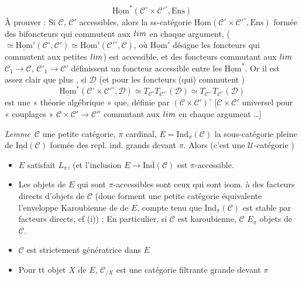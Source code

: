 \documentclass[11pt,a4paper]{article}
\begin{document}
\[
  \underline{\mathrm{Hom}}^{*}(\mathcal{C}^{\circ} \times \mathcal{C}'^{\circ},
  \mathrm{Ens})
\]
À prouver : Si $\mathcal{C}$, $\mathcal{C}'$ accessibles, alors la
ss-catégorie  $\underline{\mathrm{Hom}}(\mathcal{C}^{\circ} \times
\mathcal{C}'^{\circ}, \mathrm{Ens})$ formée des bifoncteurs qui commutent aux
$\varprojlim$  en chaque argument, ($\simeq
\underline{\mathrm{Hom}}'(\mathcal{C}^{\circ}, \mathcal{C}') \simeq
\underline{\mathrm{Hom}}'(\mathcal{C}'^{\circ}, \mathcal{C})$, où
$\underline{\mathrm{Hom}}'$ désigne les foncteurs qui commutent aux petites
$\varprojlim$) est accessible, et des foncteurs commutant aux $\varprojlim$
$\mathcal{C}_{1} \to \mathcal{C}$, $\mathcal{C}'_{1} \to \mathcal{C}'$
définissent un foncteur accessible entre les
$\underline{\mathrm{Hom}}^{*}$. Or il est assez clair que plus
, si $\mathcal{D}$  
\ill{} (et pour les foncteurs (qui) commutent \ill{})
\[
  \underline{\mathrm{Hom}}^{*}(\mathcal{C}^{\circ} \times \mathcal{C}'^{\circ},
  \mathcal{D}) \simeq T_{\mathcal{C}^{\circ}} T_{\mathcal{C}'^{\circ}}(\mathcal{D})
  \simeq T_{\mathcal{C}'^{\circ}} T_{\mathcal{C}^{\circ}}(\mathcal{D})
\]
est une « théorie algébrique » que, définie par $(\mathcal{C} \times
\mathcal{C}')^{\circ}$ [$\mathcal{C} \times \mathcal{C}'$ universel pour
« couplages » $\mathcal{C} \times \mathcal{C}' \to \mathcal{C}''$ commutant
aux $\varprojlim$ en chaque argument …]

\emph{Lemme}\ $\mathcal{C}$ une petite catégorie, $\pi$ cardinal, $E =
\mathrm{Ind}_{\pi}(\mathcal{C})$ la sous-catégorie pleine de
$\underline{\mathrm{Ind}}(\mathcal{C})$ formée des repl. ind.  grands devant $\pi$. Alors (c'est une
$\mathcal{U}$-catégorie \ill{})
\begin{itemize}
  \item[(i)] $E$ satisfait $L_{\pi}$, (et l'inclusion $E \to
    \mathrm{Ind}(\mathcal{C})$  est $\pi$-accessible.
  \item[(ii)] Les objets de $E$ qui sont $\pi$-accessibles sont ceux qui sont
    isom. à des facteurs directs d'objets de $\mathcal{C}$ (donc forment une
    petite catégorie équivalente \ill{} l'enveloppe Karoubienne de \ill{} de
    $E$, compte tenu que $\mathrm{Ind}_{\pi}(\mathcal{C})$ est stable par
    facteurs directs, cf (i)) ; En particulier, si $\mathcal{C}$ est
    karoubienne, 
    $\mathcal{C}$  $E_{\pi}$  objets de $\mathcal{C}$.
  \item[(iii)] $\mathcal{C}$ est strictement génératrice dans $E$
  \item[(iv)] Pour tt objet $X$ de $E$, $\mathcal{C}_{/X}$ est une catégorie
    filtrante  grande devant $\pi$
\end{itemize}
\struck{\ill{}}
\end{document}
